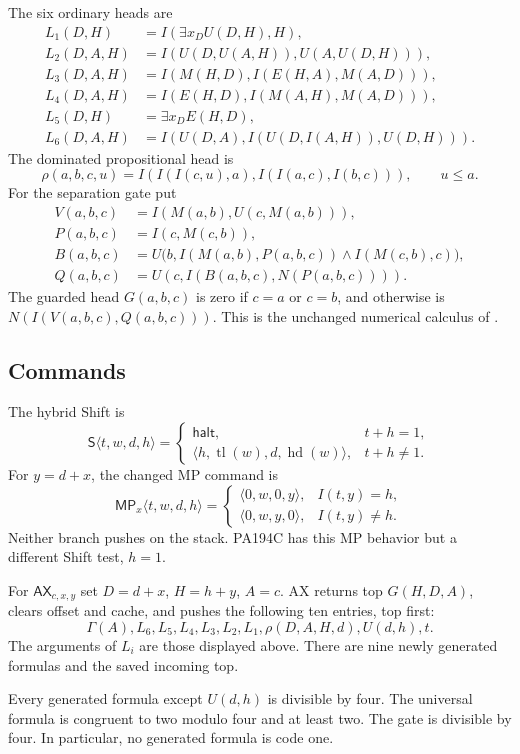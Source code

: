 \documentclass[11pt]{article}
\newcommand{\AX}{\mathsf{AX}}
\newcommand{\MP}{\mathsf{MP}}
\newcommand{\Shift}{\mathsf{S}}
\newcommand{\hd}{\operatorname{hd}}
\newcommand{\tl}{\operatorname{tl}}
\newcommand{\st}[4]{\langle #1,#2,#3,#4\rangle}
\begin{document}
The six ordinary heads are
\begin{align*}
L_1(D,H)&=I(\exists x_D U(D,H),H),\\
L_2(D,A,H)&=I(U(D,U(A,H)),U(A,U(D,H))),\\
L_3(D,A,H)&=I(M(H,D),I(E(H,A),M(A,D))),\\
L_4(D,A,H)&=I(E(H,D),I(M(A,H),M(A,D))),\\
L_5(D,H)&=\exists x_D E(H,D),\\
L_6(D,A,H)&=I(U(D,A),I(U(D,I(A,H)),U(D,H))).
\end{align*}
The dominated propositional head is
\[
 \rho(a,b,c,u)=I(I(I(c,u),a),I(I(a,c),I(b,c))),\qquad u\le a.
\]
For the separation gate put
\begin{align*}
 V(a,b,c)&=I(M(a,b),U(c,M(a,b))),\\
 P(a,b,c)&=I(c,M(c,b)),\\
 B(a,b,c)&=U\bigl(b,I(M(a,b),P(a,b,c))\wedge I(M(c,b),c)\bigr),\\
 Q(a,b,c)&=U(c,I(B(a,b,c),N(P(a,b,c)))).
\end{align*}
The guarded head $G(a,b,c)$ is zero if $c=a$ or $c=b$, and otherwise is
$N(I(V(a,b,c),Q(a,b,c)))$. This is the unchanged numerical calculus of \cite{calibration}.

\subsection{Commands}

The hybrid Shift is
\[
 \Shift\st{t}{w}{d}{h}=
 \begin{cases}
 \mathsf{halt},&t+h=1,\\
 \st{h}{\tl(w)}{d}{\hd(w)},&t+h\ne1.
 \end{cases}
\]
For $y=d+x$, the changed MP command is
\[
 \MP_x\st{t}{w}{d}{h}=
 \begin{cases}
 \st{0}{w}{0}{y},&I(t,y)=h,\\
 \st{0}{w}{y}{0},&I(t,y)\ne h.
 \end{cases}
\]
Neither branch pushes on the stack. PA194C has this MP behavior but a different Shift test, $h=1$.

For $\AX_{c,x,y}$ set $D=d+x$, $H=h+y$, $A=c$. AX returns top $G(H,D,A)$, clears offset and cache, and pushes the following ten entries, top first:
\[
 \Gamma(A),L_6,L_5,L_4,L_3,L_2,L_1,\rho(D,A,H,d),U(d,h),t.
\]
The arguments of $L_i$ are those displayed above. There are nine newly generated formulas and the saved incoming top.

Every generated formula except $U(d,h)$ is divisible by four. The universal formula is congruent to two modulo four and at least two. The gate is divisible by four. In particular, no generated formula is code one.
\end{document}
